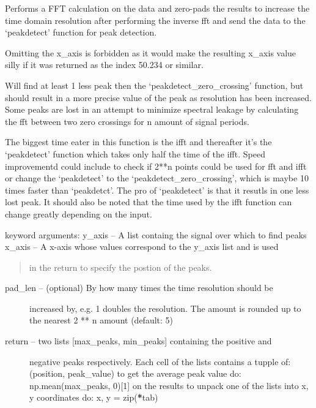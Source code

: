 \documentclass[letterpaper,10pt,english]{sphinxmanual}
\begin{document}
\begin{fulllineitems}
\label{code:peakdet.peakdetect_fft}
Performs a FFT calculation on the data and zero-pads the results to
increase the time domain resolution after performing the inverse fft and
send the data to the `peakdetect' function for peak 
detection.

Omitting the x\_axis is forbidden as it would make the resulting x\_axis
value silly if it was returned as the index 50.234 or similar.

Will find at least 1 less peak then the `peakdetect\_zero\_crossing'
function, but should result in a more precise value of the peak as
resolution has been increased. Some peaks are lost in an attempt to
minimize spectral leakage by calculating the fft between two zero
crossings for n amount of signal periods.

The biggest time eater in this function is the ifft and thereafter it's
the `peakdetect' function which takes only half the time of the ifft.
Speed improvementd could include to check if 2**n points could be used for
fft and ifft or change the `peakdetect' to the `peakdetect\_zero\_crossing',
which is maybe 10 times faster than `peakdetct'. The pro of `peakdetect'
is that it resutls in one less lost peak. It should also be noted that the
time used by the ifft function can change greatly depending on the input.

keyword arguments:
y\_axis -- A list containg the signal over which to find peaks
x\_axis -- A x-axis whose values correspond to the y\_axis list and is used
\begin{quote}

in the return to specify the postion of the peaks.
\end{quote}
\begin{description}
\item[{pad\_len -- (optional) By how many times the time resolution should be}] \leavevmode
increased by, e.g. 1 doubles the resolution. The amount is rounded up
to the nearest 2 ** n amount (default: 5)

\item[{return -- two lists {[}max\_peaks, min\_peaks{]} containing the positive and}] \leavevmode
negative peaks respectively. Each cell of the lists contains a tupple
of: (position, peak\_value) 
to get the average peak value do: np.mean(max\_peaks, 0){[}1{]} on the
results to unpack one of the lists into x, y coordinates do: 
x, y = zip({\color{red}\bfseries{}*}tab)

\end{description}

\end{fulllineitems}
\end{document}
